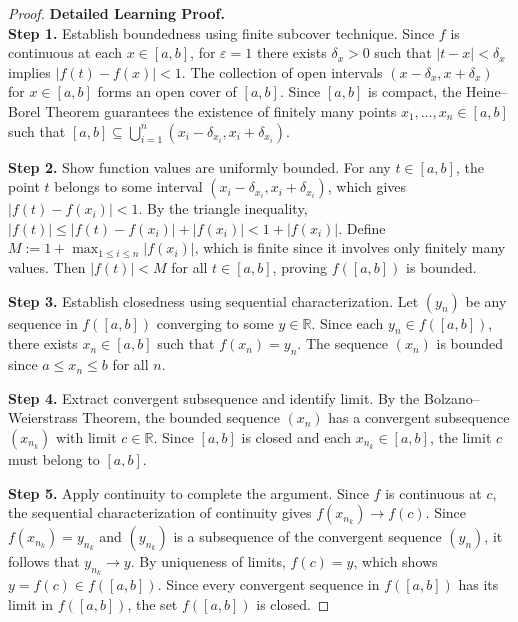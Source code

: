 \begin{proof}
\textbf{Detailed Learning Proof.}~\\

\textbf{Step 1.} Establish boundedness using finite subcover technique. Since $f$ is continuous at each $x \in [a,b]$, for $\varepsilon = 1$ there exists $\delta_x > 0$ such that $|t - x| < \delta_x$ implies $|f(t) - f(x)| < 1$. The collection of open intervals $(x - \delta_x, x + \delta_x)$ for $x \in [a,b]$ forms an open cover of $[a,b]$. Since $[a,b]$ is compact, the Heine--Borel Theorem guarantees the existence of finitely many points $x_1, \ldots, x_n \in [a,b]$ such that $[a,b] \subseteq \bigcup_{i=1}^{n} (x_i - \delta_{x_i}, x_i + \delta_{x_i})$.

\textbf{Step 2.} Show function values are uniformly bounded. For any $t \in [a,b]$, the point $t$ belongs to some interval $(x_i - \delta_{x_i}, x_i + \delta_{x_i})$, which gives $|f(t) - f(x_i)| < 1$. By the triangle inequality, $|f(t)| \leq |f(t) - f(x_i)| + |f(x_i)| < 1 + |f(x_i)|$. Define $M := 1 + \max_{1 \leq i \leq n} |f(x_i)|$, which is finite since it involves only finitely many values. Then $|f(t)| < M$ for all $t \in [a,b]$, proving $f([a,b])$ is bounded.

\textbf{Step 3.} Establish closedness using sequential characterization. Let $(y_n)$ be any sequence in $f([a,b])$ converging to some $y \in \mathbb{R}$. Since each $y_n \in f([a,b])$, there exists $x_n \in [a,b]$ such that $f(x_n) = y_n$. The sequence $(x_n)$ is bounded since $a \leq x_n \leq b$ for all $n$.

\textbf{Step 4.} Extract convergent subsequence and identify limit. By the Bolzano--Weierstrass Theorem, the bounded sequence $(x_n)$ has a convergent subsequence $(x_{n_k})$ with limit $c \in \mathbb{R}$. Since $[a,b]$ is closed and each $x_{n_k} \in [a,b]$, the limit $c$ must belong to $[a,b]$.

\textbf{Step 5.} Apply continuity to complete the argument. Since $f$ is continuous at $c$, the sequential characterization of continuity gives $f(x_{n_k}) \to f(c)$. Since $f(x_{n_k}) = y_{n_k}$ and $(y_{n_k})$ is a subsequence of the convergent sequence $(y_n)$, it follows that $y_{n_k} \to y$. By uniqueness of limits, $f(c) = y$, which shows $y = f(c) \in f([a,b])$. Since every convergent sequence in $f([a,b])$ has its limit in $f([a,b])$, the set $f([a,b])$ is closed.
\end{proof}

